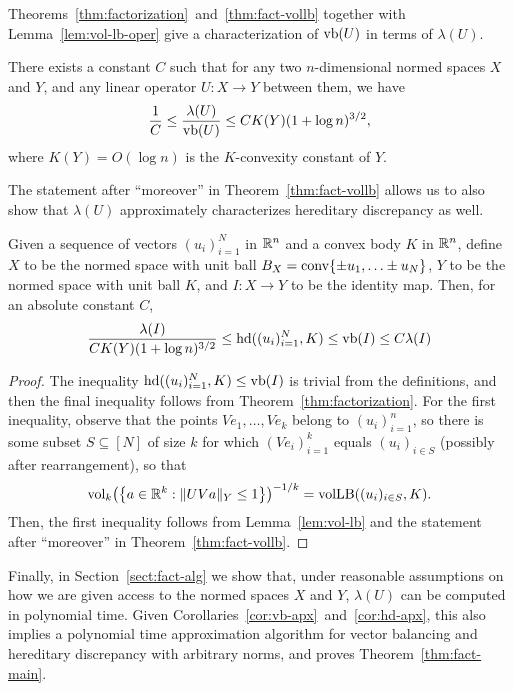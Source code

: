 Theorems~\ref{thm:factorization}~and~\ref{thm:fact-vollb} together
with Lemma~\ref{lem:vol-lb-oper} give a characterization of $\operatorname{vb}(U)$ in
terms of $\lambda(U)$.

\begin{corollary}\label{cor:vb-apx}
  There exists a constant $C$ such that for any two $n$-dimensional
  normed spaces $X$ and $Y$, and any linear operator $U:X \to Y$
  between them, we have
  \[
  \frac1C \le \frac{\lambda(U)}{\operatorname{vb}(U)} \le C K(Y) (1 + \log n)^{3/2},
  \]
  where $K(Y) = O(\log n)$ is the $K$-convexity constant of $Y$. 
\end{corollary}

The statement after ``moreover'' in Theorem~\ref{thm:fact-vollb}
allows us to also show that $\lambda(U)$ approximately characterizes
hereditary discrepancy as well.
\begin{corollary}\label{cor:hd-apx}
  Given a sequence of vectors $(u_i)_{i = 1}^N$ in ${\mathbb{R}}^n$ and a convex
  body $K$ in ${\mathbb{R}}^n$, define $X$ to be the normed space with
  unit ball $B_X = \operatorname{conv}\{\pm u_1, \ldots \pm u_N\}$, $Y$ to be
  the normed space with unit ball $K$, and $I:X \to Y$ to be the
  identity map. Then, for an absolute constant $C$,
  \[
  \frac{\lambda(I)}{C K(Y) (1 + \log n)^{3/2}} 
  \le \operatorname{hd}((u_i)_{i = 1}^N, K) \le \operatorname{vb}(I) 
  \le C \lambda(I)
  \]
\end{corollary}
\begin{proof}
 The inequality $\operatorname{hd}((u_i)_{i = 1}^N, K) \le \operatorname{vb}(I)$ is trivial from
 the definitions, and then the final inequality follows from
 Theorem~\ref{thm:factorization}. For the first inequality, observe
 that the points $Ve_1, \ldots, Ve_k$ belong to $(u_i)_{i = 1}^n$, so
 there is some subset $S \subseteq [N]$ of size $k$ for which
 $(Ve_i)_{i = 1}^k$ equals $(u_i)_{i \in S}$ (possibly after
 rearrangement), so that 
 \[
 \operatorname{vol}_k\bigl(\left\{ a \in {\mathbb{R}}^k: \|UV a\|_Y \le 1 \right\}\bigr)^{-1/k} =
 \operatorname{volLB}((u_i)_{i \in S}, K).
 \]
 Then, the first inequality follows from Lemma~\ref{lem:vol-lb} and
 the statement after ``moreover'' in Theorem~\ref{thm:fact-vollb}.
\end{proof}

Finally, in Section~\ref{sect:fact-alg} we show that, under reasonable
assumptions on how we are given access to the normed spaces $X$ and
$Y$, $\lambda(U)$ can be computed in polynomial time. Given
Corollaries~\ref{cor:vb-apx}~and~\ref{cor:hd-apx}, this also implies a
polynomial time approximation algorithm for vector balancing and
hereditary discrepancy with arbitrary norms, and proves Theorem~\ref{thm:fact-main}.

